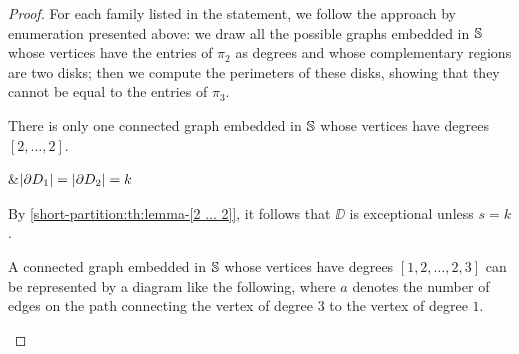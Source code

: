\begin{proof}
For each family listed in the statement, we follow the approach by enumeration presented above: we draw all the possible graphs embedded in $\mathbb{S}{}$ whose vertices have the entries of $\pi_2$ as degrees and whose complementary regions are two disks; then we compute the perimeters of these disks, showing that they cannot be equal to the entries of $\pi_3$.
\begin{enumarabic}
\item There is only one connected graph embedded in $\mathbb{S}{}$ whose vertices have degrees $[2,\ldots,2]$.
\begin{dessintext}
&$\begin{aligned}
&\lvert \partial D_1\rvert=\lvert \partial D_2\rvert=k
\end{aligned}$
\end{dessintext}
By \cref{short-partition:th:lemma-[2 ... 2]}, it follows that $\DD$ is exceptional unless $s=k$.
\item A connected graph embedded in $\mathbb{S}{}$ whose vertices have degrees $[1,2,\ldots,2,3]$ can be represented by a diagram like the following, where $a$ denotes the number of edges on the path connecting the vertex of degree $3$ to the vertex of degree $1$.


\end{enumarabic}
\end{proof}
